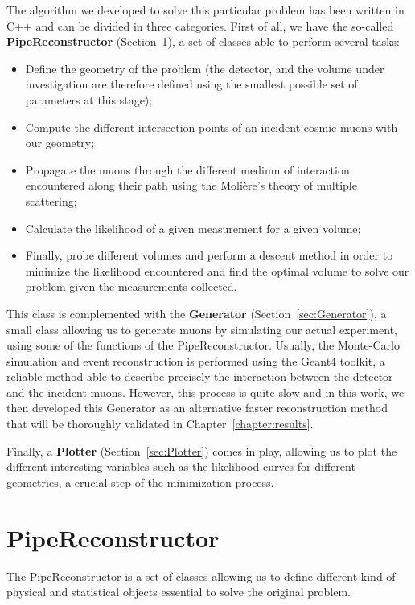 \documentclass[a4paper, 11pt, twoside, openright]{report}
\begin{document}
The algorithm we developed to solve this particular problem has been written in C++ and can be divided in three categories. First of all, we have the so-called \textbf{PipeReconstructor} (Section~\ref{sec:PipeReconstructor}), a set of classes able to perform several tasks:
\begin{itemize}
\item Define the geometry of the problem (the detector, and the volume under investigation are therefore defined using the smallest possible set of parameters at this stage);
\item Compute the different intersection points of an incident cosmic muons with our geometry;
\item Propagate the muons through the different medium of interaction encountered along their path using the Moli\`ere's theory of multiple scattering;
\item Calculate the likelihood of a given measurement for a given volume;
\item Finally, probe different volumes and perform a descent method in order to minimize the likelihood encountered and find the optimal volume to solve our problem given the measurements collected. 
\end{itemize}

This class is complemented with the \textbf{Generator} (Section~\ref{sec:Generator}), a small class allowing us to generate muons by simulating our actual experiment, using some of the functions of the PipeReconstructor. Usually, the Monte-Carlo simulation and event reconstruction is performed using the Geant4 toolkit, a reliable method able to describe precisely the interaction between the detector and the incident muons. However, this process is quite slow and in this work, we then developed this Generator as an alternative faster reconstruction method that will be thoroughly validated in Chapter~\ref{chapter:results}.

Finally, a \textbf{Plotter} (Section~\ref{sec:Plotter}) comes in play, allowing us to plot the different interesting variables such as the likelihood curves for different geometries, a crucial step of the minimization process.

\section{PipeReconstructor} \label{sec:PipeReconstructor}

The PipeReconstructor is a set of classes allowing us to define different kind of physical and statistical objects essential to solve the original problem.
\end{document}
